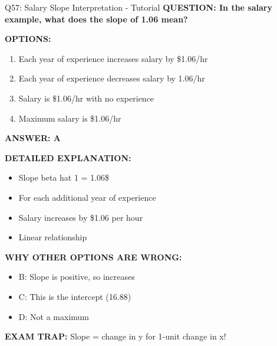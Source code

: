 \documentclass[8pt]{beamer}
\begin{document}
	\begin{frame}{Q57: Salary Slope Interpretation - Tutorial}
		\fontsize{6.5}{7.5}\selectfont
		\textbf{QUESTION: In the salary example, what does the slope of 1.06 mean?}
		
		\vspace{0.1cm}
		\textbf{OPTIONS:}
		\begin{enumerate}
			\item Each year of experience increases salary by \$1.06/hr
			\item Each year of experience decreases salary by 1.06/hr
			\item Salary is \$1.06/hr with no experience
			\item Maximum salary is \$1.06/hr
		\end{enumerate}
		
		\vspace{0.1cm}
		\textcolor{myblue}{\textbf{ANSWER: A}}
		
		\vspace{0.1cm}
		\textbf{DETAILED EXPLANATION:}
		\begin{itemize}
			\item Slope beta hat 1 = 1.06\$
			\item For each additional year of experience
			\item Salary increases by \$1.06 per hour
			\item Linear relationship
		\end{itemize}
		
		\vspace{0.1cm}
		\textcolor{myred}{\textbf{WHY OTHER OPTIONS ARE WRONG:}}
		\begin{itemize}
			\item \textcolor{myred}{B:} Slope is positive, so increases
			\item \textcolor{myred}{C:} This is the intercept (16.88)
			\item \textcolor{myred}{D:} Not a maximum
		\end{itemize}
		
		\textcolor{myred}{\textbf{EXAM TRAP:}} Slope = \textcolor{myblue}{change in y for 1-unit change in x}!
	\end{frame}
	
\end{document}
